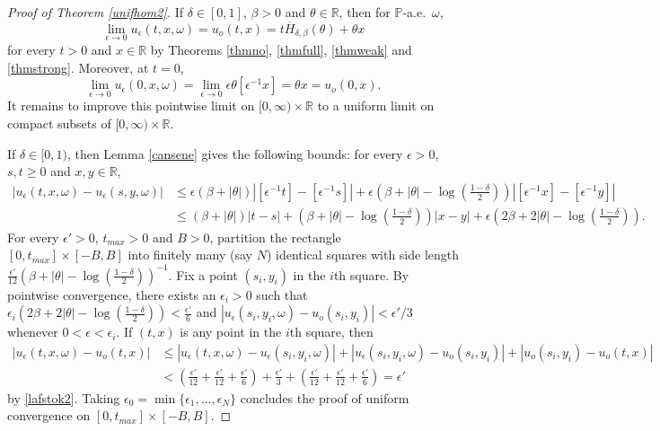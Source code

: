 \documentclass[a4paper]{amsart}
\numberwithin{equation}{section}
\theoremstyle{plain}
\theoremstyle{remark}
\begin{document}
\begin{proof}[Proof of Theorem \ref{unifhom2}]
If $\delta\in[0,1]$, $\beta>0$ and $\theta\in\mathbb{R}$, then for $\mathbb{P}$-a.e.\ $\omega$, $$\lim_{{\epsilon}\to0}u_{\epsilon}(t,x,\omega) = u_o(t,x) = t\overline H_{\delta,\beta}(\theta) + \theta x$$ for every $t>0$ and $x\in\mathbb{R}$ by Theorems \ref{thmno}, \ref{thmfull}, \ref{thmweak} and \ref{thmstrong}. Moreover, at $t=0$,
$$\lim_{{\epsilon}\to0}u_{\epsilon}(0,x,\omega) = \lim_{{\epsilon}\to0}{\epsilon}\theta[{\epsilon^{-1}} x] = \theta x = u_o(0,x).$$
It remains to improve this pointwise limit on $[0,\infty)\times\mathbb{R}$ to a uniform limit on compact subsets of $[0,\infty)\times\mathbb{R}$.

If $\delta\in[0,1)$, then Lemma \ref{cansene} gives the following bounds: for every ${\epsilon}>0$, $s,t\ge0$ and $x,y\in\mathbb{R}$,
\begin{equation} 
\begin{aligned}\label{lafstok2}
|u_{\epsilon}(t,x,\omega) - u_{\epsilon}(s,y,\omega)| 
&\le {\epsilon}(\beta + |\theta|)|[{\epsilon^{-1}} t]-[{\epsilon^{-1}} s]| + {\epsilon}(\beta + |\theta| - \textstyle{\log(\frac{1-\delta}{2})})|[{\epsilon^{-1}} x] - [{\epsilon^{-1}} y]|\\
&\le (\beta + |\theta|)|t-s| + (\beta + |\theta| - \textstyle{\log(\frac{1-\delta}{2})})|x-y| + {\epsilon}(2\beta + 2|\theta| - \textstyle{\log(\frac{1-\delta}{2})}).
\end{aligned}
\end{equation}
For every ${\epsilon}'>0$, $t_{max}>0$ and $B>0$, partition the rectangle $[0,t_{max}]\times [-B,B]$ into finitely many (say $N$) identical squares with side length $\frac{{\epsilon}'}{12}(\beta + |\theta| - \textstyle{\log(\frac{1-\delta}{2})})^{-1}$. Fix a point $(s_i,y_i)$ in the $i$th square. By pointwise convergence, there exists an ${\epsilon}_i>0$ such that ${\epsilon}_i(2\beta + 2|\theta| - \textstyle{\log(\frac{1-\delta}{2})}) < \frac{{\epsilon}'}{6}$ and $|u_{\epsilon}(s_i,y_i,\omega) - u_o(s_i,y_i)| < {\epsilon}'/3$ whenever $0<{\epsilon}<{\epsilon}_i$. If $(t,x)$ is any point in the $i$th square, then
\begin{align*}
|u_{\epsilon}(t,x,\omega) - u_o(t,x)| &\le |u_{\epsilon}(t,x,\omega) - u_{\epsilon}(s_i,y_i,\omega)| + |u_{\epsilon}(s_i,y_i,\omega) - u_o(s_i,y_i)| + |u_o(s_i,y_i) - u_o(t,x)|\\
&< \left(\frac{{\epsilon}'}{12} + \frac{{\epsilon}'}{12} + \frac{{\epsilon}'}{6}\right) + \frac{{\epsilon}'}{3} + \left(\frac{{\epsilon}'}{12} + \frac{{\epsilon}'}{12} + \frac{{\epsilon}'}{6}\right) = {\epsilon}'
\end{align*}
by \eqref{lafstok2}. Taking ${\epsilon}_0 = \min\{{\epsilon}_1,\ldots,{\epsilon}_N\}$ concludes the proof of uniform convergence on $[0,t_{max}]\times[-B,B]$.


\end{proof}
\end{document}
